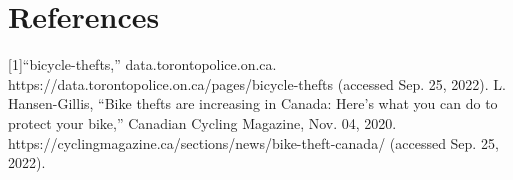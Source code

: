 \documentclass{article}
\begin{document}
\newpage
\section{References}

[1]“bicycle-thefts,” data.torontopolice.on.ca. https://data.torontopolice.on.ca/pages/bicycle-thefts (accessed Sep. 25, 2022).
\newline
[2]L. Hansen-Gillis, “Bike thefts are increasing in Canada: Here’s what you can do to protect your bike,” Canadian Cycling Magazine, Nov. 04, 2020. https://cyclingmagazine.ca/sections/news/bike-theft-canada/ (accessed Sep. 25, 2022).
‌
‌
\end{document}
